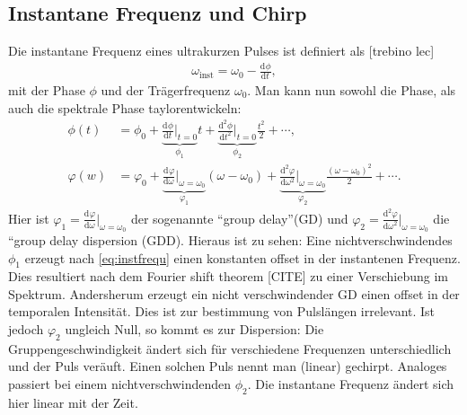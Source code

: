 \documentclass[twoside,        %
               BCOR12mm,       %
               english,ngerman, %
               fleqn,headsepline=false,footsepline=false
              ]{Vorlage/MFPREPORT}
\renewcommand{\d}{\ensuremath{\mathrm{d}}} %
\newcommand{\diff}[3][]{\ensuremath{\frac{\d^{#1}#2}{\d#3^{#1}}}} %
\begin{document}
\subsection{Instantane Frequenz und Chirp}
Die instantane Frequenz eines ultrakurzen Pulses ist definiert als [trebino lec]
\begin{align}
    \omega_{\text{inst}}=\omega_0-\diff{\phi}{t},
    \label{eq:instfrequ}
\end{align}
mit der Phase $\phi$ und der Trägerfrequenz $\omega_0$. Man kann nun sowohl die Phase, als auch die spektrale Phase taylorentwickeln: 
\begin{align}
    \phi(t)&=\phi_0+\underbrace{\diff{\phi}{t}|_{t=0}}_{\phi_1}t+\underbrace{\diff[2]{\phi}{t}|_{t=0}}_{\phi_2}\frac{t^2}{2}+\cdots,\\
    \varphi(w)&=\varphi_0+\underbrace{\diff{\varphi}{\omega}|_{\omega=\omega_0}}_{\varphi_1}(\omega-\omega_0)+\underbrace{\diff[2]{\varphi}{\omega}|_{\omega=\omega_0}}_{\varphi_2}\frac{(\omega-\omega_0)^2}{2}+\cdots.
    \label{eq:taylor}
\end{align}
Hier ist $\varphi_1=\diff{\varphi}{\omega}|_{\omega=\omega_0}$ der sogenannte ``group delay''(GD) und $\varphi_2=\diff[2]{\varphi}{\omega}|_{\omega=\omega_0}$ die ``group delay dispersion (GDD). Hieraus ist zu sehen: Eine nichtverschwindendes $\phi_1$ erzeugt nach \cref{eq:instfrequ} einen konstanten offset in der instantenen Frequenz. Dies resultiert nach dem Fourier shift theorem [CITE] zu einer Verschiebung im Spektrum. Andersherum erzeugt ein nicht verschwindender GD einen offset in der temporalen Intensität. Dies ist zur bestimmung von Pulslängen irrelevant. Ist jedoch $\varphi_2$ ungleich Null, so kommt es zur Dispersion: Die Gruppengeschwindigkeit ändert sich für verschiedene Frequenzen unterschiedlich und der Puls veräuft. Einen solchen Puls nennt man (linear) gechirpt. Analoges passiert bei einem nichtverschwindenden $\phi_2$. Die instantane Frequenz ändert sich hier linear mit der Zeit.
\end{document}
